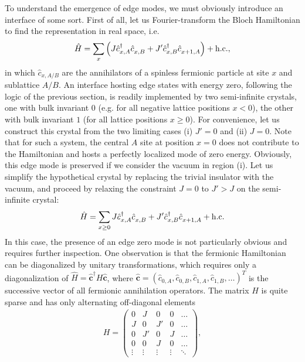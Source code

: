 To understand the emergence of edge modes, we must obviously introduce an interface of some sort.
First of all, let us Fourier-transform the Bloch Hamiltonian to find the representation in real space, i.e.
\begin{align}
    \hat H = \sum_x \brlr{J\hat c^\dag_{x,A}\hat c^\pdag_{x,B} + J' \hat c^\dag_{x,B}\hat c^\pdag_{x+1,A}} + \hc,
\end{align}
in which $\hat c_{x,A/B}$ are the annihilators of a spinless fermionic particle at site $x$ and sublattice $A/B$.
An interface hosting edge states with energy zero, following the logic of the previous section, is readily implemented by two semi-infinite crystals, one with bulk invariant $0$ (e.g. for all negative lattice positions $x<0$), the other with bulk invariant $1$ (for all lattice positions $x\geq0$).
For convenience, let us construct this crystal from the two limiting cases (i) $J'=0$ and (ii) $J=0$.
Note that for such a system, the central $A$ site at position $x=0$ does not contribute to the Hamiltonian and hosts a perfectly localized mode of zero energy.
Obviously, this edge mode is preserved if we consider the vacuum in region (i).
Let us simplify the hypothetical crystal by replacing the trivial insulator with the vacuum, and proceed by relaxing the constraint $J=0$ to $J'>J$ on the semi-infinite crystal:
\begin{align}
    \hat H = \sum_{x\geq0} J \hat c^\dag_{x,A}\hat c^\pdag_{x,B} + J' \hat c^\dag_{x,B}\hat c^\pdag_{x+1,A} + \hc
\end{align}
In this case, the presence of an edge zero mode is not particularly obvious and requires further inspection.
One observation is that the fermionic Hamiltonian can be diagonalized by unitary transformations, which requires only a diagonalization of $\hat H = \hat{\bm c}^\dag H \hat{\bm c}$, where $\hat{\bm c}=(\hat c_{0,A},\hat c_{0,B},\hat c_{1,A},\hat c_{1,B},\dots)^T$ is the successive vector of all fermionic annihilation operators.
The matrix $H$ is quite sparse and has only alternating off-diagonal elements
\begin{align}
    H =
    \begin{pmatrix}
        0 & J & 0 & 0 &\dots \\
        J & 0 & J' & 0 & \dots \\
        0 & J' & 0 & J & \dots \\
        0 & 0 & J & 0 & \dots \\
        \vdots & \vdots & \vdots & \vdots & \ddots
    \end{pmatrix},
\end{align}
